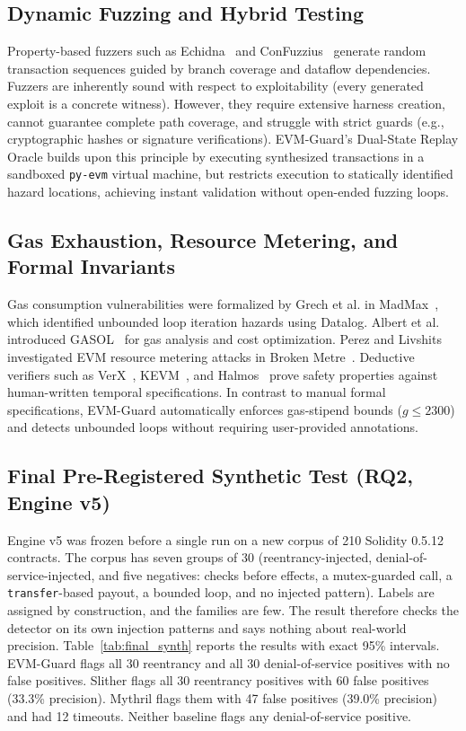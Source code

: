 \documentclass[conference]{IEEEtran}
\begin{document}
\subsection{Dynamic Fuzzing and Hybrid Testing}
Property-based fuzzers such as Echidna~\cite{grieco2020echidna} and ConFuzzius~\cite{torres2021confuzzius} generate random transaction sequences guided by branch coverage and dataflow dependencies. Fuzzers are inherently sound with respect to exploitability (every generated exploit is a concrete witness). However, they require extensive harness creation, cannot guarantee complete path coverage, and struggle with strict guards (e.g., cryptographic hashes or signature verifications). EVM-Guard's Dual-State Replay Oracle builds upon this principle by executing synthesized transactions in a sandboxed \texttt{py-evm} virtual machine, but restricts execution to statically identified hazard locations, achieving instant validation without open-ended fuzzing loops.

\subsection{Gas Exhaustion, Resource Metering, and Formal Invariants}
Gas consumption vulnerabilities were formalized by Grech et al. in MadMax~\cite{grech2018madmax}, which identified unbounded loop iteration hazards using Datalog. Albert et al. introduced GASOL~\cite{albert2020gasol} for gas analysis and cost optimization. Perez and Livshits investigated EVM resource metering attacks in Broken Metre~\cite{perez2021broken}. Deductive verifiers such as VerX~\cite{permenev2020verx}, KEVM~\cite{hildenbrandt2018kevm}, and Halmos~\cite{a16z2023halmos} prove safety properties against human-written temporal specifications. In contrast to manual formal specifications, EVM-Guard automatically enforces gas-stipend bounds ($g \le 2300$) and detects unbounded loops without requiring user-provided annotations.

\subsection{Final Pre-Registered Synthetic Test (RQ2, Engine v5)}\label{sec:eval:final}
Engine v5 was frozen before a single run on a new corpus of 210 Solidity 0.5.12 contracts. The corpus has seven groups of 30 (reentrancy-injected, denial-of-service-injected, and five negatives: checks before effects, a mutex-guarded call, a \texttt{transfer}-based payout, a bounded loop, and no injected pattern). Labels are assigned by construction, and the families are few. The result therefore checks the detector on its own injection patterns and says nothing about real-world precision. Table~\ref{tab:final_synth} reports the results with exact 95\% intervals. EVM-Guard flags all 30 reentrancy and all 30 denial-of-service positives with no false positives. Slither flags all 30 reentrancy positives with 60 false positives (33.3\% precision). Mythril flags them with 47 false positives (39.0\% precision) and had 12 timeouts. Neither baseline flags any denial-of-service positive.
\end{document}
